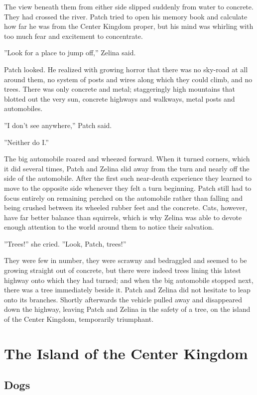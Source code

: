 \documentclass[12pt]{book}
\begin{document}
The view beneath them from either side slipped suddenly from water to
concrete. They had crossed the river. Patch tried to open his memory
book and calculate how far he was from the Center Kingdom proper, but
his mind was whirling with too much fear and excitement to
concentrate.

''Look for a place to jump off,'' Zelina said.

Patch looked. He realized with growing horror that there was no
sky-road at all around them, no system of posts and wires along which
they could climb, and no trees. There was only concrete and metal;
staggeringly high mountains that blotted out the very sun, concrete
highways and walkways, metal posts and automobiles.

''I don't see anywhere,'' Patch said.

''Neither do I.''

The big automobile roared and wheezed forward. When it turned corners,
which it did several times, Patch and Zelina slid away from the turn
and nearly off the side of the automobile. After the first such
near-death experience they learned to move to the opposite side
whenever they felt a turn beginning. Patch still had to focus entirely
on remaining perched on the automobile rather than falling and being
crushed between its wheeled rubber feet and the concrete. Cats,
however, have far better balance than squirrels, which is why Zelina
was able to devote enough attention to the world around them to notice
their salvation.

''Trees!'' she cried. ''Look, Patch, trees!''

They were few in number, they were scrawny and bedraggled and seemed
to be growing straight out of concrete, but there were indeed trees
lining this latest highway onto which they had turned; and when the
big automobile stopped next, there was a tree immediately beside
it. Patch and Zelina did not hesitate to leap onto its
branches. Shortly afterwards the vehicle pulled away and disappeared
down the highway, leaving Patch and Zelina in the safety of a tree, on
the island of the Center Kingdom, temporarily triumphant.


\chapter{The Island of the Center Kingdom}

\section{Dogs}
\end{document}
